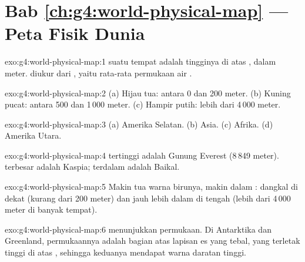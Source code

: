 \section*{Bab \ref{ch:g4:world-physical-map} --- Peta Fisik Dunia}

\begin{solution}{exo:g4:world-physical-map:1}
 suatu tempat adalah tingginya di atas , dalam
meter.  diukur dari , yaitu  rata-rata
permukaan air .
\end{solution}

\begin{solution}{exo:g4:world-physical-map:2}
(a) Hijau tua: antara 0 dan 200 meter. (b) Kuning pucat: antara 500 dan
1\,000 meter. (c) Hampir putih: lebih dari 4\,000 meter.
\end{solution}

\begin{solution}{exo:g4:world-physical-map:3}
(a) Amerika Selatan. (b) Asia. (c) Afrika. (d) Amerika Utara.
\end{solution}

\begin{solution}{exo:g4:world-physical-map:4}
 tertinggi adalah Gunung Everest (8\,849 meter).  terbesar adalah
 Kaspia;  terdalam adalah  Baikal.
\end{solution}

\begin{solution}{exo:g4:world-physical-map:5}
Makin tua warna birunya, makin dalam :  dangkal di dekat 
(kurang dari 200 meter) dan jauh lebih dalam di tengah  (lebih dari
4\,000 meter di banyak tempat).
\end{solution}

\begin{solution}{exo:g4:world-physical-map:6}
 menunjukkan  permukaan. Di Antarktika dan Greenland,
permukaannya adalah bagian atas lapisan es yang tebal, yang terletak tinggi
di atas , sehingga keduanya mendapat warna daratan tinggi.
\end{solution}

